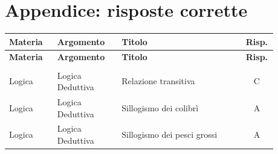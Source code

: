 \documentclass[12pt]{article}
\begin{document}
\newpage
\section*{Appendice: risposte corrette}
\begin{longtable}{@{}>{\raggedright\arraybackslash}p{0.18\linewidth}>{\raggedright\arraybackslash}p{0.24\linewidth}>{\raggedright\arraybackslash}p{0.46\linewidth}c@{}}
\toprule
\textbf{Materia} & \textbf{Argomento} & \textbf{Titolo} & \textbf{Risp.} \\
\midrule
\endfirsthead
\toprule
\textbf{Materia} & \textbf{Argomento} & \textbf{Titolo} & \textbf{Risp.} \\
\midrule
\endhead
\midrule
\multicolumn{4}{r}{\footnotesize\textit{Continua}} \\
\endfoot
\bottomrule
\endlastfoot
Logica & Logica Deduttiva & Relazione transitiva & C \\
Logica & Logica Deduttiva & Sillogismo dei colibrì & A \\
Logica & Logica Deduttiva & Sillogismo dei pesci grossi & A
\end{longtable}
\end{document}
